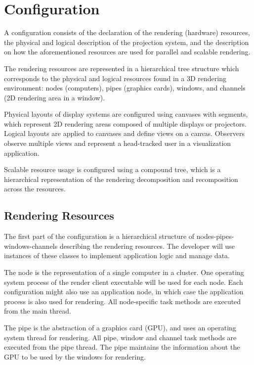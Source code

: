 \section{Configuration}

A configuration consists of the declaration of the rendering (hardware)
resources, the physical and logical  description of the projection system, and
the description on how the  aforementioned resources are used for parallel and
scalable rendering.

The rendering resources are represented in a hierarchical tree structure
which corresponds to the physical and logical resources found in a 3D
rendering environment: nodes (computers), pipes (graphics cards),
windows, and channels (2D rendering area in a window).

Physical layouts of display systems are configured using canvases with
segments, which represent 2D rendering areas composed of multiple
displays or projectors. Logical layouts are applied to canvases and
define views on a canvas. Observers observe multiple views and represent a head-tracked user in a visualization application.

Scalable resource usage is configured using a compound tree, which is a
hierarchical representation of the rendering decomposition and
recomposition across the resources.

\subsection{Rendering Resources}

The first part of the configuration is a hierarchical structure of
nodes-pipes-win\-dows-channels describing the rendering resources. The developer
will use instances of these classes to implement application logic and manage
data.

The \textsf{node} is the representation of a single computer in a cluster. One operating
system process of the render client executable will be used for each node. Each
configuration might also use an application node, in which case the application
process is also used for rendering. All node-specific task methods are executed
from the main thread.

The \textsf{pipe} is the abstraction of a graphics card (GPU), and uses an
operating system thread for rendering. All pipe, window and channel task methods
are executed from the pipe thread. The pipe maintains the information about the
GPU to be used by the windows for rendering.

